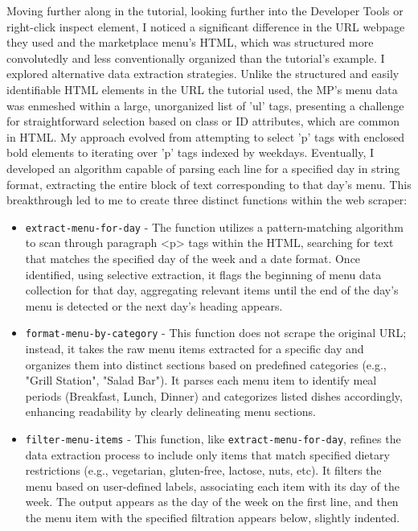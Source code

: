 \documentclass[10pt,twocolumn]{article}
\begin{document}
Moving further along in the tutorial, looking further into the Developer Tools or right-click inspect element, I noticed a significant difference in the URL webpage they used and the marketplace menu's HTML, which was structured more convolutedly and less conventionally organized than the tutorial's example. I explored alternative data extraction strategies. Unlike the structured and easily identifiable HTML elements in the URL the tutorial used, the MP's menu data was enmeshed within a large, unorganized list of 'ul' tags, presenting a challenge for straightforward selection based on class or ID attributes, which are common in HTML. 
My approach evolved from attempting to select 'p' tags with enclosed bold elements to iterating over 'p' tags indexed by weekdays. Eventually, I developed an algorithm capable of parsing each line for a specified day in string format, extracting the entire block of text corresponding to that day's menu. This breakthrough led to me to create three distinct functions within the web scraper:


\begin{itemize}
    \item \texttt{extract-menu-for-day} - The function utilizes a pattern-matching algorithm to scan through paragraph <p> tags within the HTML, searching for text that matches the specified day of the week and a date format. Once identified, using selective extraction, it flags the beginning of menu data collection for that day, aggregating relevant items until the end of the day's menu is detected or the next day's heading appears. 
    \item \texttt{format-menu-by-category} - This function does not scrape the original URL; instead, it takes the raw menu items extracted for a specific day and organizes them into distinct sections based on predefined categories (e.g., "Grill Station", "Salad Bar"). It parses each menu item to identify meal periods (Breakfast, Lunch, Dinner) and categorizes listed dishes accordingly, enhancing readability by clearly delineating menu sections.
     \item \texttt{filter-menu-items} - This function, like \texttt{extract-menu-for-day}, refines the data extraction process to include only items that match specified dietary restrictions (e.g., vegetarian, gluten-free, lactose, nuts, etc). It filters the menu based on user-defined labels, associating each item with its day of the week. The output appears as the day of the week on the first line, and then the menu item with the specified filtration appears below, slightly indented. 
     
\end{itemize}
\end{document}
